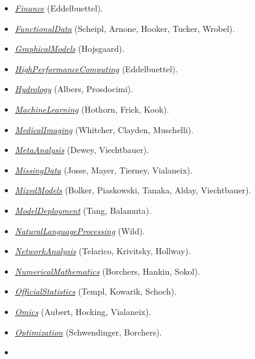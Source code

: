 \begin{itemize}
\item
  \href{https://CRAN.R-project.org/view=Finance}{\emph{Finance}} (Eddelbuettel).
\item
  \href{https://CRAN.R-project.org/view=FunctionalData}{\emph{FunctionalData}} (Scheipl, Arnone, Hooker, Tucker, Wrobel).
\item
  \href{https://CRAN.R-project.org/view=GraphicalModels}{\emph{GraphicalModels}} (Hojsgaard).
\item
  \href{https://CRAN.R-project.org/view=HighPerformanceComputing}{\emph{HighPerformanceComputing}} (Eddelbuettel).
\item
  \href{https://CRAN.R-project.org/view=Hydrology}{\emph{Hydrology}} (Albers, Prosdocimi).
\item
  \href{https://CRAN.R-project.org/view=MachineLearning}{\emph{MachineLearning}} (Hothorn, Frick, Kook).
\item
  \href{https://CRAN.R-project.org/view=MedicalImaging}{\emph{MedicalImaging}} (Whitcher, Clayden, Muschelli).
\item
  \href{https://CRAN.R-project.org/view=MetaAnalysis}{\emph{MetaAnalysis}} (Dewey, Viechtbauer).
\item
  \href{https://CRAN.R-project.org/view=MissingData}{\emph{MissingData}} (Josse, Mayer, Tierney, Vialaneix).
\item
  \href{https://CRAN.R-project.org/view=MixedModels}{\emph{MixedModels}} (Bolker, Piaskowski, Tanaka, Alday, Viechtbauer).
\item
  \href{https://CRAN.R-project.org/view=ModelDeployment}{\emph{ModelDeployment}} (Tang, Balamuta).
\item
  \href{https://CRAN.R-project.org/view=NaturalLanguageProcessing}{\emph{NaturalLanguageProcessing}} (Wild).
\item
  \href{https://CRAN.R-project.org/view=NetworkAnalysis}{\emph{NetworkAnalysis}} (Telarico, Krivitsky, Hollway).
\item
  \href{https://CRAN.R-project.org/view=NumericalMathematics}{\emph{NumericalMathematics}} (Borchers, Hankin, Sokol).
\item
  \href{https://CRAN.R-project.org/view=OfficialStatistics}{\emph{OfficialStatistics}} (Templ, Kowarik, Schoch).
\item
  \href{https://CRAN.R-project.org/view=Omics}{\emph{Omics}} (Aubert, Hocking, Vialaneix).
\item
  \href{https://CRAN.R-project.org/view=Optimization}{\emph{Optimization}} (Schwendinger, Borchers).
\item

\end{itemize}
